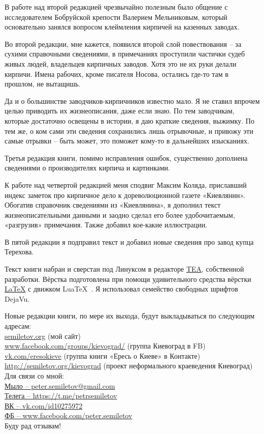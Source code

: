 В работе над второй редакцией чрезвычайно полезным было общение с исследователем Бобруйской крепости Валерием Мельниковым, который основательно занялся вопросом клеймления кирпичей на казенных заводах.

Во второй редакции, мне кажется, появился второй слой повествования – за сухими справочными сведениями, в примечаниях проступили частички судеб живых людей, владельцев кирпичных заводов. Хотя это не их руки делали кирпичи. Имена рабочих, кроме писателя Носова, остались где-то там в прошлом, не вытащишь. 

Да и о большинстве заводчиков-кирпичников известно мало. Я не ставил впрочем целью приводить их жизнеописания, даже если знаю. По тем заводчикам, которые достаточно освещены в истории, я даю краткие сведения, выжимку. По тем же, о ком сами эти сведения сохранились лишь отрывочные, и привожу эти самые отрывки – быть может, это поможет кому-то в дальнейших изысканиях.

Третья редакция книги, помимо исправления ошибок, существенно дополнена сведениями о производителях кирпича и картинками.

К работе над четвертой редакцией меня сподвиг Максим Коляда, приславший индекс заметок про кирпичное дело к дореволюционной газете «Киевлянин». Обогатив справочник сведениями из «Киевлянина», я дополнил текст жизнеописательными данными и заодно сделал его более удобочитаемым, «разгрузив» примечания. Также добавил кое-какие иллюстрации.

В пятой редакции я подправил текст и добавил новые сведения про завод купца Терехова.

Текст книги набран и сверстан под Линуксом в редакторе \href{http://semiletov.org/tea}{TEA}, собственной разработки. Вёрстка подготовлена при помощи удивительного средства вёрстки \href{http://www.latex-project.org}{\LaTeX} с движком Lua\TeX~. Я использовал семейство свободных шрифтов DejaVu.

Новые редакции книги, по мере их выхода, будут выкладываться по следующим адресам:\\ 

\noindent
\href{http://semiletov.org}{semiletov.org} (мой сайт)\\ 
\href{https://www.facebook.com/groups/kievograd/}{www.facebook.com/groups/kievograd/} (группа Киевоград в FB)\\ 
\href{https://vk.com/eresokieve}{vk.com/eresokieve} (группа книги «Ересь о Киеве» в Контакте)\\ 
\href{http://semiletov.org/kievograd}{http://semiletov.org/kievograd} (проект неформального краеведения Киевоград)\\ 

Для связи со мной:\\ \href{mailto:peter.semiletov@gmail.com}{Мыло –  peter.semiletov@gmail.com}\\ 
\href{https://t.me/petrsemiletov}{Телега – https://t.me/petrsemiletov}\\
\href{https://vk.com/id10275972}{ВК – vk.com/id10275972}\\
\href{https://www.facebook.com/peter.semiletov}{ФБ – www.facebook.com/peter.semiletov}\\


Буду рад отзывам!